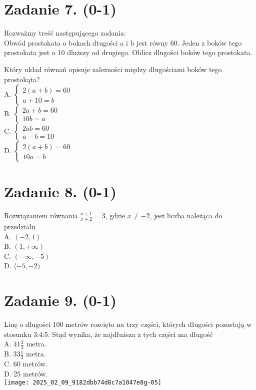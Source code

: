 \documentclass[10pt]{article}
\begin{document}
\section*{Zadanie 7. (0-1)}
Rozważmy treść następującego zadania:\\
Obwód prostokata o bokach dtugości a i b jest równy 60. Jeden z boków tego prostokata jest o 10 dluższy od drugiego. Oblicz dlugości boków tego prostokata.

Który układ równań opisuje zależności między długościami boków tego prostokąta?\\
A. \(\left\{\begin{array}{l}2(a+b)=60 \\ a+10=b\end{array}\right.\)\\
B. \(\left\{\begin{array}{l}2 a+b=60 \\ 10 b=a\end{array}\right.\)\\
C. \(\left\{\begin{array}{l}2 a b=60 \\ a-b=10\end{array}\right.\)\\
D. \(\left\{\begin{array}{l}2(a+b)=60 \\ 10 a=b\end{array}\right.\)

\section*{Zadanie 8. (0-1)}
Rozwiązaniem równania \(\frac{x+1}{x+2}=3\), gdzie \(x \neq-2\), jest liczba należąca do przedziału\\
A. \((-2,1)\)\\
B. \((1,+\infty)\)\\
C. \((-\infty,-5)\)\\
D. \(\langle-5,-2)\)

\section*{Zadanie 9. (0-1)}
Linę o długości 100 metrów rozcięto na trzy części, których długości pozostają w stosunku 3:4:5. Stąd wynika, że najdłuższa z tych części ma długość\\
A. \(41 \frac{2}{3}\) metra.\\
B. \(33 \frac{1}{3}\) metra.\\
C. 60 metrów.\\
D. 25 metrów.\\
\texttt{[image: 2025\_02\_09\_9182dbb74d8c7a1047e8g-05]}
\end{document}
